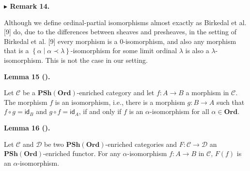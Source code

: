 \documentclass[10pt,a4paper]{article}
\begin{document}
 
 
\par\medskip\noindent\textbf{$\blacktriangleright$ Remark 14.}\par
 
 
Although we define ordinal-partial isomorphisms almost exactly as Birkedal et al. [9] do, due to the differences between sheaves and presheaves, in the setting of Birkedal et al. [9] every morphism is a 0-isomorphism, and also any morphism that is a $\left\{\alpha\middle|\alpha\prec\lambda\right\}$-isomorphism for some limit ordinal $\lambda$ is also a $\lambda$-isomorphism. This is not the case in our setting.\par
 
 
 
 
\par\medskip\noindent\textbf{Lemma 15 ().}\par
 
 
Let $\mathcal{C}$ be a $\mathbf{PSh}(\mathbf{Ord})$-enriched category and let $f:A\to B$ a morphism in $\mathcal{C}$. The morphism $f$ is an isomorphism, i.e., there is a morphism $g:B\to A$ such that $f\circ g=\mathsf{id}_{B}$ and $g\circ f=\mathsf{id}_{A}$, if and only if $f$ is an $\alpha$-isomorphism for all $\alpha\in\mathbf{Ord}$.\par
 
 
 
 
\par\medskip\noindent\textbf{Lemma 16 ().}\par
 
 
Let $\mathcal{C}$ and $\mathcal{D}$ be two $\mathbf{PSh}(\mathbf{Ord})$-enriched categories and $F:\mathcal{C}\to\mathcal{D}$ an $\mathbf{PSh}(\mathbf{Ord})$-enriched functor. For any $\alpha$-isomorphism $f:A\to B$ in $\mathcal{C}$, $F(f)$ is an $\alpha$-isomorphism.\par
 
 
 
\end{document}
